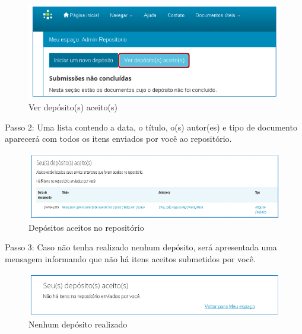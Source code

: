 \documentclass[12pt,hidelinks]{article}
\begin{document}
\newpage
    
    \begin{figure}[!htp]
                \centering
                \includegraphics[scale=0.8]{figura/Figura166.png}
                \caption{Ver depósito(s) aceito(s)}
            \label{Rotulo}
        \end{figure}
    
    Passo 2: Uma lista contendo a data, o título, o(s) autor(es) e tipo de documento aparecerá com todos os itens enviados por você ao repositório.
    
    \begin{figure}[!htp]
                \centering
                \includegraphics[scale=0.8]{figura/Figura167.png}
                \caption{Depósitos aceitos no repositório}
            \label{Rotulo}
        \end{figure}
    
    Passo 3: Caso não tenha realizado nenhum depósito, será apresentada uma mensagem informando que não há itens aceitos submetidos por você.
    
     \begin{figure}[!htp]
                \centering
                \includegraphics[scale=0.8]{figura/Figura168.png}
                \caption{Nenhum depósito realizado}
            \label{Rotulo}
        \end{figure}
\end{document}
